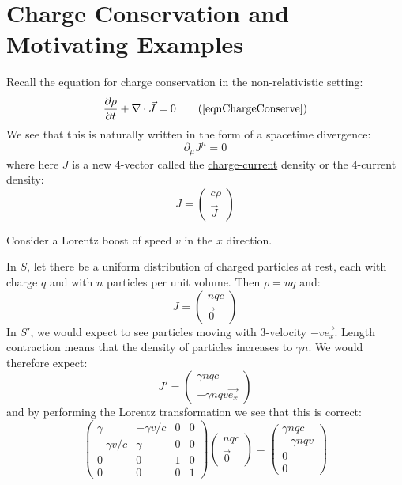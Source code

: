 \documentclass[../Main.tex]{subfiles}
\begin{document}
\section{Charge Conservation and Motivating Examples}
Recall the equation for charge conservation in the non-relativistic setting:
\begin{equation*}
    \frac{\partial \rho}{\partial t} + \nabla \cdot \vec{J} = 0 \tag{\ref{eqnChargeConserve}}
\end{equation*}
We see that this is naturally written in the form of a spacetime divergence:
\begin{equation}
    \partial_\mu J^\mu = 0
    \label{eqnChargeConserveRelativ}
\end{equation}
where here $J$ is a new 4-vector called the \underline{charge-current} density or the 4-current density:
\begin{equation*}
    J = \begin{pmatrix}c\rho \\ \vec{J}\end{pmatrix}
\end{equation*}
\begin{example}
    Consider a Lorentz boost of speed $v$ in the $x$ direction.

    In $S$, let there be a uniform distribution of charged particles at rest, each with charge $q$ and with $n$ particles per unit volume. Then $\rho = nq$ and:
    \begin{equation*}
        J = \begin{pmatrix}nqc \\ \vec{0}\end{pmatrix}
    \end{equation*}
    In $S'$, we would expect to see particles moving with $3$-velocity $-v\vec{e_x}$. Length contraction means that the density of particles increases to $\gamma n$. We would therefore expect:
    \begin{equation*}
        J' = \begin{pmatrix}\gamma n q c \\ -\gamma n q v\vec{e_x}\end{pmatrix}
    \end{equation*}
    and by performing the Lorentz transformation we see that this is correct:
    \begin{equation*}
        \begin{pmatrix}
            \gamma & -\gamma v / c & 0 & 0 \\
            -\gamma v / c & \gamma & 0 & 0 \\
            0 & 0 & 1 & 0 \\
            0 & 0 & 0 & 1
        \end{pmatrix}
        \begin{pmatrix}nqc \\ \vec{0}\end{pmatrix}
        = \begin{pmatrix}\gamma n q c \\ -\gamma n q v \\ 0 \\ 0\end{pmatrix}
    \end{equation*}
\end{example}
\end{document}
